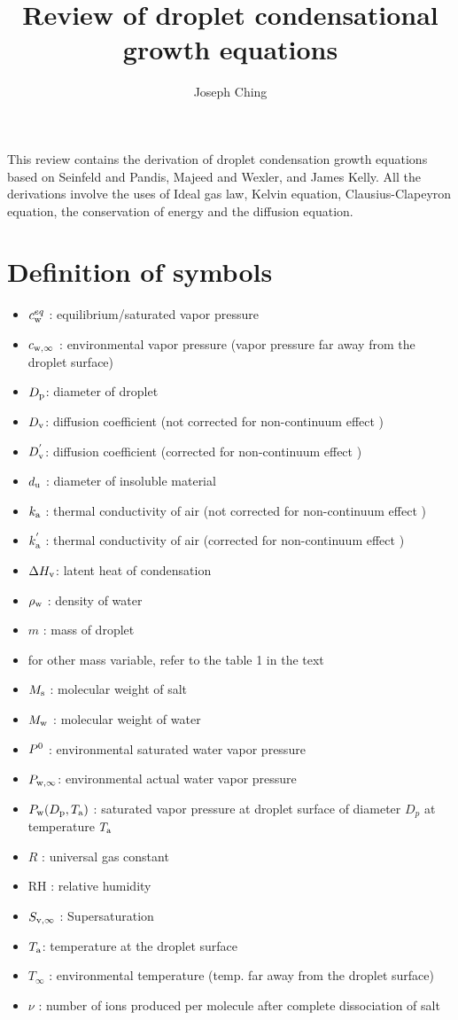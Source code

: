 \documentclass[12pt]{article}
\title{Review of droplet condensational growth equations}
\author{Joseph Ching}
\begin{document}
\maketitle
\tableofcontents

This review contains the derivation of droplet condensation growth equations based on Seinfeld and Pandis, Majeed and Wexler, and James Kelly. All the derivations involve the uses of Ideal gas law, Kelvin equation, Clausius-Clapeyron equation, the conservation of energy and the diffusion equation.

\section{Definition of symbols}

\begin{itemize}
\item $c_{\rm w}^{eq}$ : equilibrium/saturated vapor pressure
\item $c_{\rm w, \infty}$ : environmental vapor pressure (vapor pressure far away from the droplet surface)
\item $D_{\rm p}$: diameter of droplet 
\item $D_{\rm v}$: diffusion coefficient (not corrected for non-continuum effect )
\item $D_{\rm v}^{'}$: diffusion coefficient (corrected for non-continuum effect )
\item $d_{\rm u}$ : diameter of insoluble material
\item $k_{\rm a}$ : thermal conductivity of air (not corrected for non-continuum effect )
\item $k_{\rm a}^{'}$ : thermal conductivity of air (corrected for non-continuum effect )
\item $\Delta H_{\rm v}$: latent heat of condensation
\item $\rho_{\rm w}$ : density of water
\item $m$ : mass of droplet
\item for other mass variable, refer to the table 1 in the text
\item $M_{\rm s}$ : molecular weight of salt
\item $M_{\rm w}$ : molecular weight of water
\item $P^{\rm 0}$ : environmental saturated water vapor pressure 
\item $P_{\rm w,\infty} $: environmental actual water vapor pressure
\item $P_{\rm w}(D_{\rm p}, T_{\rm a}) $ : saturated vapor pressure at droplet surface of diameter $ D_{p}$ at temperature $T_{\rm a}$  
\item $R$ : universal gas constant
\item $\textrm{RH}$ : relative humidity
\item $S_{\rm v, \infty}$ : Supersaturation  
\item $T_{\rm a}$: temperature at the droplet surface
\item $T_{\infty}$ : environmental temperature (temp. far away from the droplet surface)
\item $\nu$ : number of ions produced per molecule after complete dissociation of salt 
\end{itemize}
\end{document}
